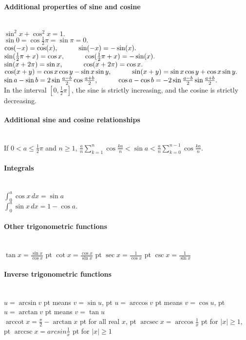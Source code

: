 \documentclass[10pt]{article}
\DeclareMathOperator{\arccot}{arccot}
\DeclareMathOperator{\arcsec}{arcsec}
\DeclareMathOperator{\arccsc}{arccsc}
\begin{document}
\paragraph{Additional properties of sine and cosine}\ \\
$\sin^2 x + \cos^2 x = 1.$\\
$\sin 0 = \cos \frac{1}{2} \pi = \sin \pi = 0.$\\
$\cos(-x) = \cos(x), \hskip 30 pt \sin(-x) = - \sin(x).$\\
$\sin(\frac{1}{2} \pi + x) = \cos x, \hskip 30 pt \cos(\frac{1}{2}\pi + x) = - \sin(x).$\\
$\sin(x + 2\pi) = \sin x, \hskip 30 pt \cos(x + 2\pi) = \cos x.$\\
$\cos(x+y) = \cos x \cos y - \sin x \sin y, \hskip 30 pt \sin(x+y) = \sin x \cos y + \cos x \sin y.$\\
$\sin a - \sin b = 2 \sin \frac{a - b}{2} \cos \frac{a+b}{2}, \hskip 30 pt \cos a - \cos b = -2\sin \frac{a-b}{2} \sin \frac{a+b}{2}.$\\
In the interval $[0, \frac{1}{2}\pi]$, the sine is strictly increasing, and the cosine is strictly decreasing.

\paragraph{Additional sine and cosine relationships}\ \\ 
If $0 < a \leq \frac{1}{2}\pi$ and $n \geq 1$,
$\frac{a}{n} \sum_{k=1}^n \cos \frac{ka}{n} < \sin a < \frac{a}{n} \sum_{k=0}^{n-1} \cos \frac{ka}{n}.$

\paragraph{Integrals}\ \\
$\int_0^a \cos x\,dx = \sin a$\\
$\int_0^a \sin x\,dx = 1 - \cos a.$

\paragraph{Other trigonometric functions}\ \\
$\tan x = \frac{\sin x}{\cos x}$  pt
$\cot x = \frac{\cos x}{\sin x}$  pt
$\sec x = \frac{1}{\cos x}$  pt
$\csc x = \frac{1}{\sin x}$

\paragraph{Inverse trigonometric functions}\ \\
$u = \arcsin v$  pt means $v = \sin u$,  pt
$u = \arccos v$  pt means $v = \cos u$,  pt
$u = \arctan v$  pt means $v = \tan u$\\
$\arccot x = \frac{\pi}{2} - \arctan x$  pt for all real $x$,  pt
$\arcsec x = \arccos \frac{1}{x}$  pt for $|x| \geq 1$,  pt
$\arccsc x = arcsin \frac{1}{x}$  pt for $|x| \geq 1$
\end{document}
